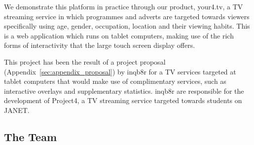 We demonstrate this platform in practice through our product, your4.tv, a TV streaming service in which programmes and adverts are targeted towards viewers specifically using age, gender, occupation, location and their viewing habits. This is a web application which runs on tablet computers, making use of the rich forms of interactivity that the large touch screen display offers.




This project has been the result of a project proposal (Appendix~\ref{sec:appendix_proposal}) by inqb8r for a TV services targeted at tablet computers that would make use of complimentary services, such as interactive overlays and supplementary statistics. inqb8r are responsible for the development of Project4, a TV streaming service targeted towards students on JANET.

\subsection{The Team}


